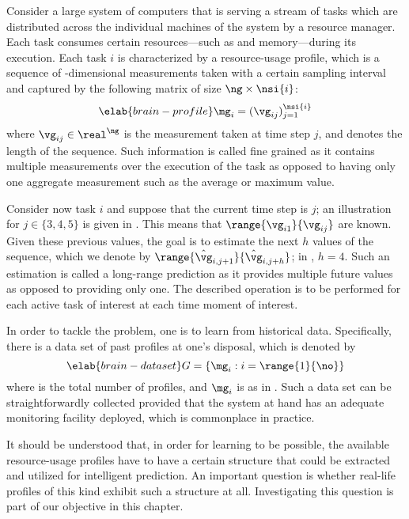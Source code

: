 Consider a large system of computers that is serving a stream of tasks which are
distributed across the individual machines of the system by a resource manager.
Each task consumes certain resources---such as  and memory---during its
execution. Each task $i$ is characterized by a resource-usage profile, which is
a sequence of \ng-dimensional measurements taken with a certain sampling
interval and captured by the following matrix of size $\ng \times \nsi{i}$:
\begin{equation} \elab{brain-profile}
  \mg_i = (\vg_{ij})_{j = 1}^\nsi{i}
\end{equation}
where $\vg_{ij} \in \real^\ng$ is the measurement taken at time step $j$, and
 denotes the length of the sequence. Such information is called
fine grained as it contains multiple measurements over the execution of the task
as opposed to having only one aggregate measurement such as the average or
maximum value.

Consider now task $i$ and suppose that the current time step is $j$; an
illustration for $j \in \{ 3, 4, 5 \}$ is given in .
This means that $\range{\vg_{i1}}{\vg_{ij}}$ are known. Given these previous
values, the goal is to estimate the next $h$ values of the sequence, which we
denote by $\range{\hat{\vg}_{i, j + 1}}{\hat{\vg}_{i, j + h}}$; in
, $h = 4$. Such an estimation is called a long-range
prediction as it provides multiple future values as opposed to providing only
one. The described operation is to be performed for each active task of interest
at each time moment of interest.

In order to tackle the problem, one is to learn from historical data.
Specifically, there is a data set of past profiles at one's disposal, which is
denoted by
\begin{equation} \elab{brain-dataset}
  G = \left\{ \mg_i: i = \range{1}{\no} \right\}
\end{equation}
where \no is the total number of profiles, and $\mg_i$ is as in
. Such a data set can be straightforwardly collected
provided that the system at hand has an adequate monitoring facility deployed,
which is commonplace in practice.

It should be understood that, in order for learning to be possible, the
available resource-usage profiles have to have a certain structure that could be
extracted and utilized for intelligent prediction. An important question is
whether real-life profiles of this kind exhibit such a structure at all.
Investigating this question is part of our objective in this chapter.
